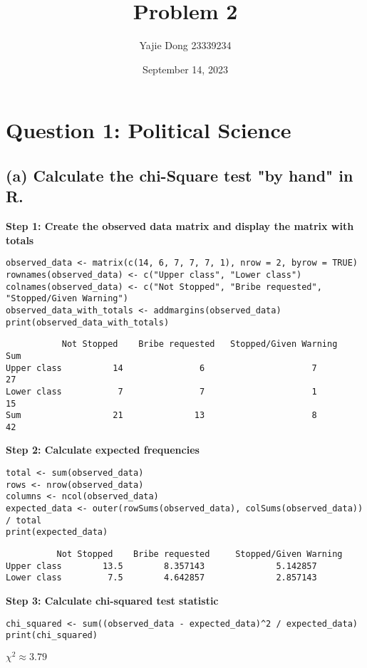 \documentclass[12pt]{article}
\title{Problem 2}
\date{September 14, 2023}
\author{Yajie Dong 23339234}
\begin{document}
\maketitle

\section{Question 1: Political Science}

\subsection{(a) Calculate the chi-Square test "by hand" in R.}

\textbf{Step 1: Create the observed data matrix and display the matrix with totals}

\lstset{style=my}
\begin{lstlisting}
observed_data <- matrix(c(14, 6, 7, 7, 7, 1), nrow = 2, byrow = TRUE)
rownames(observed_data) <- c("Upper class", "Lower class")
colnames(observed_data) <- c("Not Stopped", "Bribe requested", "Stopped/Given Warning")
observed_data_with_totals <- addmargins(observed_data)
print(observed_data_with_totals)
\end{lstlisting}
\begin{verbatim}
           Not Stopped    Bribe requested   Stopped/Given Warning      Sum
Upper class          14               6                     7         27
Lower class           7               7                     1         15
Sum                  21              13                     8         42
\end{verbatim}
\textbf{Step 2: Calculate expected frequencies}
\lstset{style=my}
\begin{lstlisting}
total <- sum(observed_data)
rows <- nrow(observed_data)
columns <- ncol(observed_data)
expected_data <- outer(rowSums(observed_data), colSums(observed_data)) / total
print(expected_data)
\end{lstlisting}
\begin{verbatim}
          Not Stopped    Bribe requested     Stopped/Given Warning
Upper class        13.5        8.357143              5.142857
Lower class         7.5        4.642857              2.857143
\end{verbatim}
\textbf{Step 3: Calculate chi-squared test statistic}
\lstset{style=my}
\begin{lstlisting}
chi_squared <- sum((observed_data - expected_data)^2 / expected_data)
print(chi_squared)
\end{lstlisting}
\begin{center}
\(\chi^2 \approx 3.79\)    
\end{center}
\end{document}

